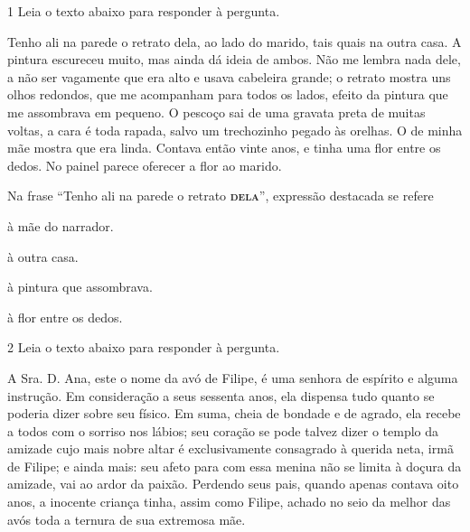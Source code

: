 \num{1} Leia o texto abaixo para responder à pergunta.

\begin{myquote}

Tenho ali na parede o retrato dela, ao lado do marido, tais quais na outra
casa. A pintura escureceu muito, mas ainda dá ideia de ambos. Não me lembra
nada dele, a não ser vagamente que era alto e usava cabeleira grande; o
retrato mostra uns olhos redondos, que me acompanham para todos os lados,
efeito da pintura que me assombrava em pequeno. O pescoço sai de uma gravata
preta de muitas voltas, a cara é toda rapada, salvo um trechozinho pegado às
orelhas. O de minha mãe mostra que era linda. Contava então vinte anos, e
tinha uma flor entre os dedos. No painel parece oferecer a flor ao marido.


\end{myquote}

Na frase ``Tenho ali na parede o retrato \textsc{\textbf{dela}}'', expressão destacada
se refere

\begin{escolha}

  \item à mãe do narrador.
  
  \item à outra casa. 
  
  \item à pintura que assombrava.
  
  \item à flor entre os dedos.  

\end{escolha}


\num{2} Leia o texto abaixo para responder à pergunta.

\begin{myquote}

A Sra. D. Ana, este o nome da avó de Filipe, é uma senhora de espírito e
alguma instrução. Em consideração a seus sessenta anos, ela dispensa tudo
quanto se poderia dizer sobre seu físico. Em suma, cheia de bondade e de
agrado, ela recebe a todos com o sorriso nos lábios; seu coração se pode
talvez dizer o templo da amizade cujo mais nobre altar é exclusivamente
consagrado à querida neta, irmã de Filipe; e ainda mais: seu afeto para com
essa menina não se limita à doçura da amizade, vai ao ardor da paixão.
Perdendo seus pais, quando apenas contava oito anos, a inocente criança tinha,
assim como Filipe, achado no seio da melhor das avós toda a ternura de sua
extremosa mãe.


\end{myquote}

